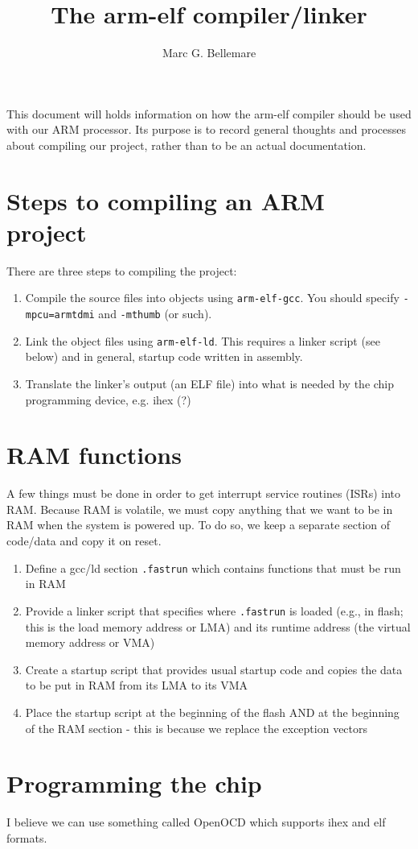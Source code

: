 \documentclass[12pt]{article}
\title{The arm-elf compiler/linker}
\author{Marc G. Bellemare}
\begin{document}
\maketitle

This document will holds information on how the arm-elf compiler should
be used with our ARM processor. Its purpose is to record general thoughts
and processes about compiling our project, rather than to be an actual
documentation.

\section{Steps to compiling an ARM project}

There are three steps to compiling the project:

\begin{enumerate}
\item{Compile the source files into objects using \verb+arm-elf-gcc+. You 
should specify \verb+-mpcu=armtdmi+ and \verb+-mthumb+ (or such).}
\item{Link the object files using \verb+arm-elf-ld+. This requires a linker
script (see below) and in general, startup code written in assembly.}
\item{Translate the linker's output (an ELF file) into what is needed by
the chip programming device, e.g. ihex (?)}
\end{enumerate}

\section{RAM functions}

A few things must be done in order to get interrupt service routines (ISRs)
into RAM. Because RAM is volatile, we must copy anything that we want to be
in RAM when the system is powered up. To do so, we keep a separate section
of code/data and copy it on reset.

\begin{enumerate}
\item{Define a gcc/ld section \verb+.fastrun+ which contains functions that
must be run in RAM}
\item{Provide a linker script that specifies where \verb+.fastrun+ is
loaded (e.g., in flash; this is the load memory address or LMA) and its 
runtime address (the virtual memory address or VMA)}
\item{Create a startup script that provides usual startup code and copies the
data to be put in RAM from its LMA to its VMA}
\item{Place the startup script at the beginning of the flash AND at the
beginning of the RAM section - this is because we replace the exception vectors}
\end{enumerate}

\section{Programming the chip}

I believe we can use something called OpenOCD which supports ihex and elf
formats.
\end{document}
